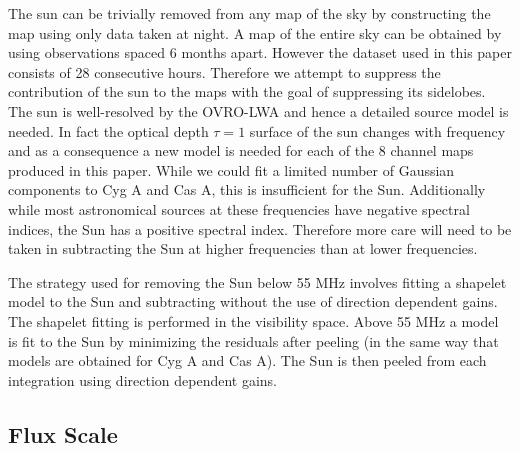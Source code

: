\documentclass[twocolumn]{aastex61}
\begin{document}
The sun can be trivially removed from any map of the sky by constructing the map using only data
taken at night. A map of the entire sky can be obtained by using observations spaced 6 months apart.
However the dataset used in this paper consists of 28 consecutive hours. Therefore we attempt to
suppress the contribution of the sun to the maps with the goal of suppressing its sidelobes.  The
sun is well-resolved by the OVRO-LWA and hence a detailed source model is needed. In fact the
optical depth $\tau=1$ surface of the sun changes with frequency and as a consequence a new model is
needed for each of the 8 channel maps produced in this paper. While we could fit a limited number of
Gaussian components to Cyg A and Cas A, this is insufficient for the Sun.  Additionally while most
astronomical sources at these frequencies have negative spectral indices, the Sun has a positive
spectral index. Therefore more care will need to be taken in subtracting the Sun at higher
frequencies than at lower frequencies.

The strategy used for removing the Sun below 55 MHz involves fitting a shapelet
\citep{2003MNRAS.338...35R} model to the Sun and subtracting without the use of direction dependent
gains. The shapelet fitting is performed in the visibility space. Above 55 MHz a model is fit to the
Sun by minimizing the residuals after peeling (in the same way that models are obtained for Cyg A
and Cas A). The Sun is then peeled from each integration using direction dependent gains.

\subsection{Flux Scale}
\end{document}

